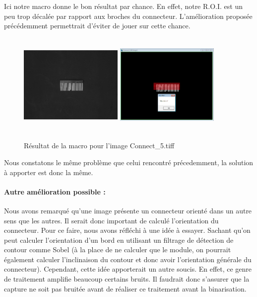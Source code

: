 \documentclass{scrreprt}
\begin{document}
Ici notre macro donne le bon résultat par chance. En effet, notre R.O.I. est un peu trop décalée par rapport aux broches du connecteur. L'amélioration
proposée précédemment permettrait d'éviter de jouer sur cette chance. 

\newpage
\begin{figure}[!h]
\centering
\includegraphics[width=5cm, height=5cm]{images/Connect5o.png}\hfill
\includegraphics[width=5cm, height=5cm]{images/connecteur5.png}
\caption{Résultat de la macro pour l'image Connect_5.tiff}
\end{figure}

Nous constatons le même problème que celui rencontré précedemment, la solution à apporter est donc la même. 

\paragraph{Autre amélioration possible : } 
Nous avons remarqué qu'une image présente un connecteur orienté dans un autre sens que les autres.
Il serait donc important de calculé l'orientation du connecteur. Pour ce faire, nous avons réfléchi à une
idée à essayer. Sachant qu'on peut calculer l'orientation d'un bord en utilisant un filtrage de détection 
de contour comme Sobel (à la place de ne calculer que le module, on pourrait également calculer l'inclinaison 
du contour et donc avoir l'orientation générale du connecteur). Cependant, cette idée apporterait un autre soucis.
En effet, ce genre de traitement amplifie beaucoup certains bruits. Il faudrait donc s'assurer que la capture ne soit
pas bruitée avant de réaliser ce traitement avant la binarisation.   
\end{document}

